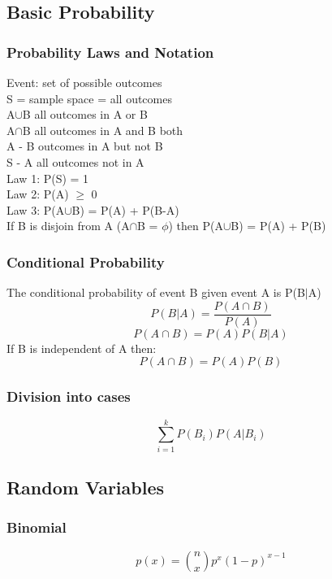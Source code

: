 \documentclass[landscape, 12pt]{report}
\begin{document}
\begin{multicols*}{3}
\subsection*{Basic Probability}
\subsubsection*{Probability Laws and Notation}
\begin{center}
Event: set of possible outcomes\\
S = sample space = all outcomes\\
A$\cup$B all outcomes in A or B\\
A$\cap$B all outcomes in A and B both\\
A - B outcomes in A but not B\\
S - A all outcomes not in A\\
Law 1: P(S) = 1\\
Law 2: P(A) $\geq$ 0\\
Law 3: P(A$\cup$B) = P(A) + P(B-A)\\
If B is disjoin from A (A$\cap$B = $\phi$) then
P(A$\cup$B) = P(A) + P(B)\\
\end{center}
\subsubsection*{Conditional Probability}    
The conditional probability of event B given event A is P(B$\lvert$A)
\begin{equation}
    P(B\lvert A) = \frac{P(A\cap B)}{P(A)}
\end{equation}
\begin{equation}
    P(A\cap B) = P(A)P(B\lvert A)
\end{equation}
If B is independent of A then:
\begin{equation}
    P(A\cap B) = P(A)P(B)
\end{equation}
\subsubsection*{Division into cases}
\begin{equation}
    \sum_{i=1}^kP(B_i)P(A\lvert B_i)
\end{equation}
\columnbreak
\subsection*{Random Variables}
\subsubsection*{Binomial}
\begin{equation}
    p(x) = {n\choose x}p^x( 1-p)^{x-1}
\end{equation}

\end{multicols*}
\end{document}

